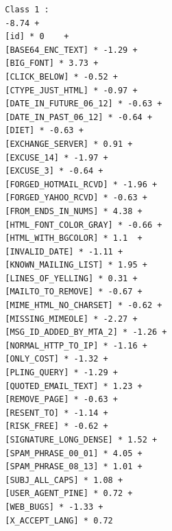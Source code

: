 {\begin{multicols}{2}
\begin{verbatim}
		Class 1 :
		-8.74 + 
		[id] * 0    +
		[BASE64_ENC_TEXT] * -1.29 +
		[BIG_FONT] * 3.73 +
		[CLICK_BELOW] * -0.52 +
		[CTYPE_JUST_HTML] * -0.97 +
		[DATE_IN_FUTURE_06_12] * -0.63 +
		[DATE_IN_PAST_06_12] * -0.64 +
		[DIET] * -0.63 +
		[EXCHANGE_SERVER] * 0.91 +
		[EXCUSE_14] * -1.97 +
		[EXCUSE_3] * -0.64 +
		[FORGED_HOTMAIL_RCVD] * -1.96 +
		[FORGED_YAHOO_RCVD] * -0.63 +
		[FROM_ENDS_IN_NUMS] * 4.38 +
		[HTML_FONT_COLOR_GRAY] * -0.66 +
		[HTML_WITH_BGCOLOR] * 1.1  +
		[INVALID_DATE] * -1.11 +
		[KNOWN_MAILING_LIST] * 1.95 +
		[LINES_OF_YELLING] * 0.31 +
		[MAILTO_TO_REMOVE] * -0.67 +
		[MIME_HTML_NO_CHARSET] * -0.62 +
		[MISSING_MIMEOLE] * -2.27 +
		[MSG_ID_ADDED_BY_MTA_2] * -1.26 +
		[NORMAL_HTTP_TO_IP] * -1.16 +
		[ONLY_COST] * -1.32 +
		[PLING_QUERY] * -1.29 +
		[QUOTED_EMAIL_TEXT] * 1.23 +
		[REMOVE_PAGE] * -0.63 +
		[RESENT_TO] * -1.14 +
		[RISK_FREE] * -0.62 +
		[SIGNATURE_LONG_DENSE] * 1.52 +
		[SPAM_PHRASE_00_01] * 4.05 +
		[SPAM_PHRASE_08_13] * 1.01 +
		[SUBJ_ALL_CAPS] * 1.08 +
		[USER_AGENT_PINE] * 0.72 +
		[WEB_BUGS] * -1.33 +
		[X_ACCEPT_LANG] * 0.72
	\end{verbatim}
\end{multicols}
}
\pagebreak
